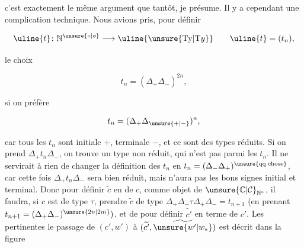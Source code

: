 
c'est exactement le même argument que tantôt,  je présume. Il y a cependant une complication technique. Nous  avions pris, pour définir

\[
\uline{t}\colon\mathbb{N}^{\unsure{\circ|o}}\longrightarrow\uline{\unsure{\mathrm{Ty}|\mathrm{T}y}}\qquad \uline{t}=(t_n),
\]

le choix

\[
t_n=(\Delta_+\Delta_-)^{2n},
\]

 si on préfère

\[
t_n=(\Delta_+\Delta_{\unsure{+|-}})^n,
\]

car tous  les $t_n$ sont   initiale $+$, terminale $-$, et ce sont des types réduits. Si on prend $\Delta_+t_n\Delta_-$, on trouve un type non réduit, qui n'est pas parmi les $t_n$. Il ne servirait à rien de changer la définition des $t_n$ en $t_n=(\Delta_-\Delta_+)^{\text{\unsure{qq chose}}}$, car cette fois $\Delta_+t_n\Delta_-$ sera bien réduit, mais n'aura pas les bons signes initial et terminal. Donc pour définir $\widetilde c$ en  de $c$, comme objet de $\unsure{\mathbb{C}|\mathcal{C}}_{\mathbb{N}^{\circ}}$,  il faudra, si $c$ est de type $\tau$, prendre $\widetilde c$ de type $\Delta_+\Delta_-\tau\Delta_+\Delta_-=t_{n+1}$ (en prenant $t_{n+1}=(\Delta_+\Delta_-)^{\unsure{2n|2m}})$, et de  pour définir $\widetilde{c'}$ en terme de $c'$. Les  pertinentes  le passage de $(c',w')$ à $(\widetilde{c'},\widetilde{\unsure{w'|w_*}})$ est décrit dans la figure

